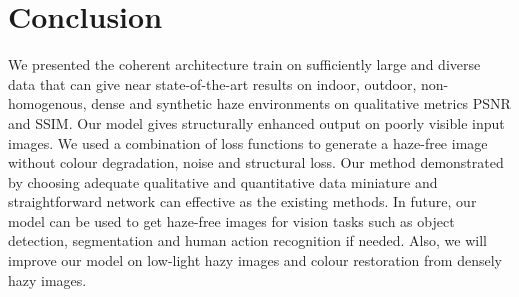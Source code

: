 \section{Conclusion}
\label{conclusion}
We presented the coherent architecture train on sufficiently large and diverse data that can give near state-of-the-art results on indoor, outdoor, non-homogenous, dense and synthetic haze environments on qualitative metrics PSNR and SSIM. Our model gives structurally enhanced output on poorly visible input images. We used a combination of loss functions to generate a haze-free image without colour degradation, noise and structural loss. Our method demonstrated by choosing adequate qualitative and quantitative data miniature and straightforward network can effective as the existing methods. In future, our model can be used to get haze-free images for vision tasks such as object detection,  segmentation and human action recognition if needed. Also, we will improve our model on low-light hazy images and colour restoration from densely hazy images.
\vspace{12pt}

